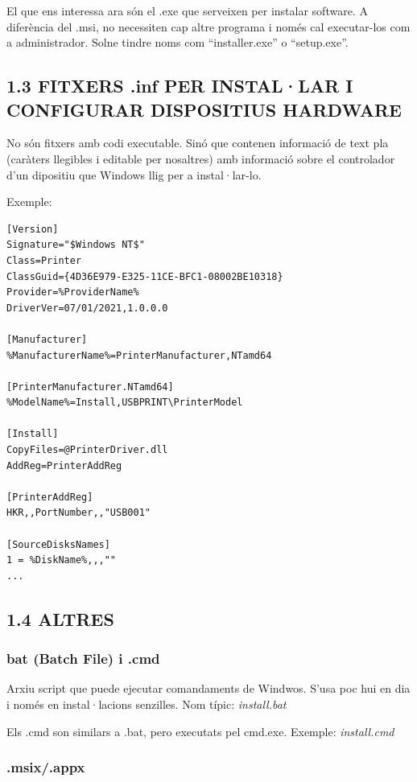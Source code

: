 \documentclass[
  a4paper,
]{article}
\begin{document}
El que ens interessa ara són el .exe que serveixen per instalar
software. A diferència del .msi, no necessiten cap altre programa i
només cal executar-los com a administrador. Solne tindre noms com
``installer.exe'' o ``setup.exe''.

\subsection{1.3 FITXERS .inf PER INSTAL·LAR I CONFIGURAR DISPOSITIUS
HARDWARE}\label{fitxers-.inf-per-installar-i-configurar-dispositius-hardware}

No són fitxers amb codi executable. Sinó que contenen informació de text
pla (caràters llegibles i editable per nosaltres) amb informació sobre
el controlador d'un dipositiu que Windows llig per a instal·lar-lo.

Exemple:

\begin{verbatim}
[Version]
Signature="$Windows NT$"
Class=Printer
ClassGuid={4D36E979-E325-11CE-BFC1-08002BE10318}
Provider=%ProviderName%
DriverVer=07/01/2021,1.0.0.0

[Manufacturer]
%ManufacturerName%=PrinterManufacturer,NTamd64

[PrinterManufacturer.NTamd64]
%ModelName%=Install,USBPRINT\PrinterModel

[Install]
CopyFiles=@PrinterDriver.dll
AddReg=PrinterAddReg

[PrinterAddReg]
HKR,,PortNumber,,"USB001"

[SourceDisksNames]
1 = %DiskName%,,,""
...
\end{verbatim}

\subsection{1.4 ALTRES}\label{altres}

\subsubsection{bat (Batch File) i .cmd}\label{bat-batch-file-i-.cmd}

Arxiu script que puede ejecutar comandaments de Windwos. S'usa poc hui
en dia i només en instal·lacions senzilles. Nom típic:
\emph{install.bat}

Els .cmd son similars a .bat, pero executats pel cmd.exe. Exemple:
\emph{install.cmd}

\subsubsection{.msix/.appx}\label{msix.appx}
\end{document}
